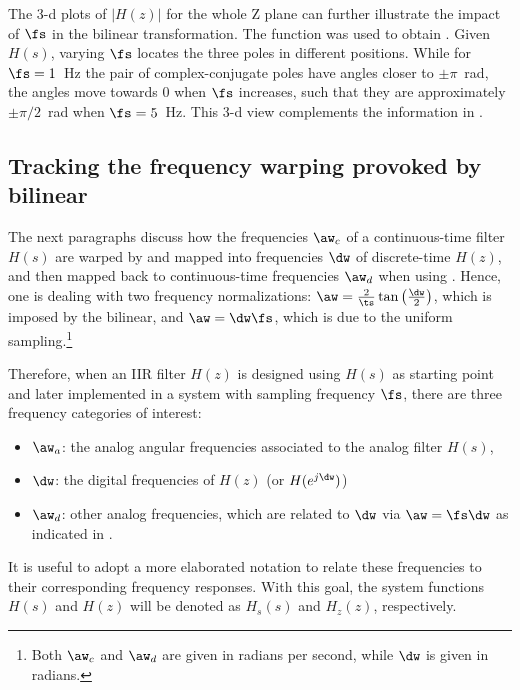 The 3-d plots of $|H(z)|$ for the whole Z plane can further illustrate the impact of $\fs$ in
the bilinear transformation.
The function 
was used to obtain . Given $H(s)$, varying $\fs$ locates the
three poles in different positions. While for $\fs=1$~Hz the pair of complex-conjugate poles
have angles closer to $\pm \pi$~rad, the angles move towards 0 when $\fs$ increases, such that
they are approximately $\pm \pi/2$~rad when $\fs=5$~Hz. This 3-d view complements the information
in .
\eExample


\subsection{Tracking the frequency warping provoked by bilinear}

The next paragraphs discuss how the frequencies $\aw_c$ of a continuous-time filter $H(s)$ are warped by  and mapped into frequencies $\dw$ of discrete-time
$H(z)$, and then mapped back to continuous-time frequencies $\aw_d$ when using . Hence, one is dealing with
two frequency normalizations: 
$\aw = \frac{2}{\ts} \tan \left( \frac{\dw}{2} \right)$, which is imposed by the bilinear, and $\aw = \dw \fs$, which
is due to the uniform sampling.\footnote{Both $\aw_c$ and $\aw_d$ are given in radians per second, while $\dw$ is given in radians.}

Therefore, when an IIR filter $H(z)$ is designed using $H(s)$ as starting point and later implemented in a system with sampling frequency $\fs$, there are three frequency categories of interest:
\begin{itemize}
	\item $\aw_a$: the analog angular frequencies associated to the analog filter $H(s)$,
	\item $\dw$: the digital frequencies of $H(z)$ (or $H(e^{j \dw})$)
	\item $\aw_d$: other analog frequencies, which are related to $\dw$ via $\aw = \fs \dw$ as indicated in .
\end{itemize}
It is useful to adopt a more elaborated
notation to relate these frequencies to their corresponding frequency responses. With this
goal, the system functions $H(s)$ and $H(z)$ will be denoted as $H_s(s)$ and $H_z(z)$, respectively.

